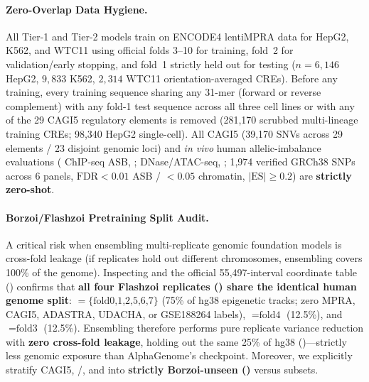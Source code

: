 \documentclass[10.5pt,a4paper]{article}
\begin{document}
\paragraph{Zero-Overlap Data Hygiene.}
All Tier-1 and Tier-2 models train on ENCODE4 lentiMPRA data for HepG2, K562, and WTC11 \citep{agarwal2025} using official folds 3--10 for training, fold~2 for validation/early stopping, and fold~1 strictly held out for testing ($n=6{,}146$ HepG2, $9{,}833$ K562, $2{,}314$ WTC11 orientation-averaged CREs). Before any training, every training sequence sharing any 31-mer (forward or reverse complement) with any fold-1 test sequence across all three cell lines or with any of the 29 CAGI5 regulatory elements \citep{kircher2019} is removed (281,170 scrubbed multi-lineage training CREs; 98,340 HepG2 single-cell). All CAGI5 (39,170 SNVs across 29 elements / 23 disjoint genomic loci) and \emph{in vivo} human allelic-imbalance evaluations ( ChIP-seq ASB, \citealp{abramov2021};  DNase/ATAC-seq, \citealp{abramov2025}; 1,974 verified GRCh38 SNPs across 6 panels, $\text{FDR}<0.01$ ASB / $<0.05$ chromatin, $|\text{ES}|\ge 0.2$) are \textbf{strictly zero-shot}.

\paragraph{Borzoi/Flashzoi Pretraining Split Audit.}
A critical risk when ensembling multi-replicate genomic foundation models is cross-fold leakage (if replicates hold out different chromosomes, ensembling covers 100\% of the genome). Inspecting  and the official 55,497-interval coordinate table () confirms that \textbf{all four Flashzoi replicates () share the identical human genome split}:  $=\{\text{fold0,1,2,5,6,7}\}$ (75\% of hg38 epigenetic tracks; zero MPRA, CAGI5, ADASTRA, UDACHA, or GSE188264 labels),  $=\text{fold4}$ (12.5\%), and  $=\text{fold3}$ (12.5\%). Ensembling  therefore performs pure replicate variance reduction with \textbf{zero cross-fold leakage}, holding out the same 25\% of hg38 ()---strictly less genomic exposure than AlphaGenome's  checkpoint. Moreover, we explicitly stratify CAGI5, /, and  into \textbf{strictly Borzoi-unseen ()} versus  subsets.
\end{document}
